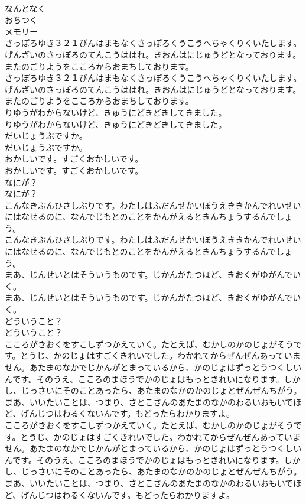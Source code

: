\documentclass[8pt]{extreport}
\begin{document}
\begin{CJK}{UTF8}{min}
\\	なんとなく
\\	おちつく
\\	メモリー
\\	さっぽろゆき３２１びんはまもなくさっぽろくうこうへちゃくりくいたします。げんざいのさっぽろのてんこうははれ。きおんはにじゅうどとなっております。またのごりようをこころからおまちしております。
\\	さっぽろゆき３２１びんはまもなくさっぽろくうこうへちゃくりくいたします。げんざいのさっぽろのてんこうははれ。きおんはにじゅうどとなっております。またのごりようをこころからおまちしております。
\\	りゆうがわからないけど、きゅうにどきどきしてきました。
\\	りゆうがわからないけど、きゅうにどきどきしてきました。
\\	だいじょうぶですか。
\\	だいじょうぶですか。
\\	おかしいです。すごくおかしいです。
\\	おかしいです。すごくおかしいです。
\\	なにが？
\\	なにが？
\\	こんなきぶんひさしぶりです。わたしはふだんせかいぼうえききかんでれいせいにはなせるのに、なんでじもとのことをかんがえるときんちょうするんでしょう。
\\	こんなきぶんひさしぶりです。わたしはふだんせかいぼうえききかんでれいせいにはなせるのに、なんでじもとのことをかんがえるときんちょうするんでしょう。
\\	まあ、じんせいとはそういうものです。じかんがたつほど、きおくがゆがんでいく。
\\	まあ、じんせいとはそういうものです。じかんがたつほど、きおくがゆがんでいく。
\\	どういうこと？
\\	どういうこと？
\\	こころがきおくをすこしずつかえていく。たとえば、むかしのかのじょがそうです。とうじ、かのじょはすごくきれいでした。わかれてからぜんぜんあっていません。あたまのなかでじかんがとまっているから、かのじょはずっとうつくしいんです。そのうえ、こころのまほうでかのじょはもっときれいになります。しかし、じっさいにそのことあったら、あたまのなかのかのじょとぜんぜんちがう。まあ、いいたいことは、つまり、さとこさんのあたまのなかのわるいおもいでほど、げんじつはわるくないんです。もどったらわかりますよ。
\\	こころがきおくをすこしずつかえていく。たとえば、むかしのかのじょがそうです。とうじ、かのじょはすごくきれいでした。わかれてからぜんぜんあっていません。あたまのなかでじかんがとまっているから、かのじょはずっとうつくしいんです。そのうえ、こころのまほうでかのじょはもっときれいになります。しかし、じっさいにそのことあったら、あたまのなかのかのじょとぜんぜんちがう。まあ、いいたいことは、つまり、さとこさんのあたまのなかのわるいおもいでほど、げんじつはわるくないんです。もどったらわかりますよ。

\end{CJK}
\end{document}
